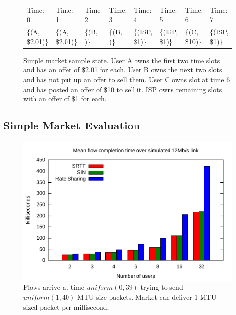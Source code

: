 \begin{figure}

\newlength{\slotwidth}
\setlength{\slotwidth}{.103\textwidth}

\renewcommand{\arraystretch}{2}
\begin{tabular}[height=3in]{|p{\slotwidth}|p{\slotwidth}|p{\slotwidth}|p{\slotwidth}|p{\slotwidth}|p{\slotwidth}|p{\slotwidth}|p{\slotwidth}|}
\hline
Time: 0 & Time: 1 & Time: 2 & Time: 3 & Time: 4 & Time: 5 & Time: 6 & Time: 7 \\
\{(A, \$2.01)\} & \{(A, \$2.01)\} & \{(B, )\} & \{(B, )\} & \{(ISP, \$1)\} & \{(ISP, \$1)\} & \{(C, \$10)\} & \{(ISP, \$1)\} \\
\hline
\end{tabular}
\caption{Simple market sample state. User A owns the first two time slots and has an offer of \$2.01 for each. User B owns the next two slots and has not put up an offer to sell them. User C owns slot at time 6 and has posted an offer of \$10 to sell it. ISP owns remaining slots with an offer of \$1 for each.}
\label{f:simple_market}
\end{figure}

\subsection{Simple Market Evaluation}
\begin{figure}
\includegraphics[width=\columnwidth]{plots/delay_over_srtf.pdf}
\caption{Flows arrive at time $uniform(0, 39)$ trying to send $uniform(1, 40)$ MTU size packets. Market can deliver 1 MTU sized packet per millisecond.}
\label{f:delay_over_srtf}
\end{figure}

